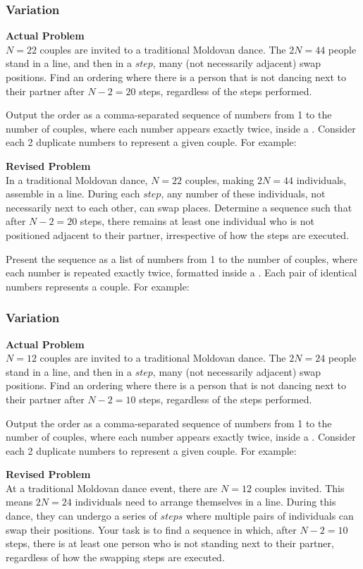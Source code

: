 \subsubsection{Variation}
\textbf{Actual Problem}\\
$N=22$ couples are invited to a traditional Moldovan dance. The $2N=44$ people stand in a line, and then in a $\textit{step}$, many (not necessarily adjacent) swap positions. Find an ordering where there is a person that is not dancing next to their partner after $N-2=20$ steps, regardless of the steps performed.

Output the order as a comma-separated sequence of numbers from 1 to the number of couples, where each number appears exactly twice, inside a \boxed. Consider each 2 duplicate numbers to represent a given couple. For example: 

\textbf{Revised Problem}\\
In a traditional Moldovan dance, $N=22$ couples, making $2N=44$ individuals, assemble in a line. During each $\textit{step}$, any number of these individuals, not necessarily next to each other, can swap places. Determine a sequence such that after $N-2=20$ steps, there remains at least one individual who is not positioned adjacent to their partner, irrespective of how the steps are executed.

Present the sequence as a list of numbers from 1 to the number of couples, where each number is repeated exactly twice, formatted inside a \boxed. Each pair of identical numbers represents a couple. For example: 

\subsubsection{Variation}
\textbf{Actual Problem}\\
$N=12$ couples are invited to a traditional Moldovan dance. The $2N=24$ people stand in a line, and then in a $\textit{step}$, many (not necessarily adjacent) swap positions. Find an ordering where there is a person that is not dancing next to their partner after $N-2=10$ steps, regardless of the steps performed.

Output the order as a comma-separated sequence of numbers from 1 to the number of couples, where each number appears exactly twice, inside a \boxed. Consider each 2 duplicate numbers to represent a given couple. For example: 

\textbf{Revised Problem}\\
At a traditional Moldovan dance event, there are $N=12$ couples invited. This means $2N=24$ individuals need to arrange themselves in a line. During this dance, they can undergo a series of $\textit{steps}$ where multiple pairs of individuals can swap their positions. Your task is to find a sequence in which, after $N-2=10$ steps, there is at least one person who is not standing next to their partner, regardless of how the swapping steps are executed.

